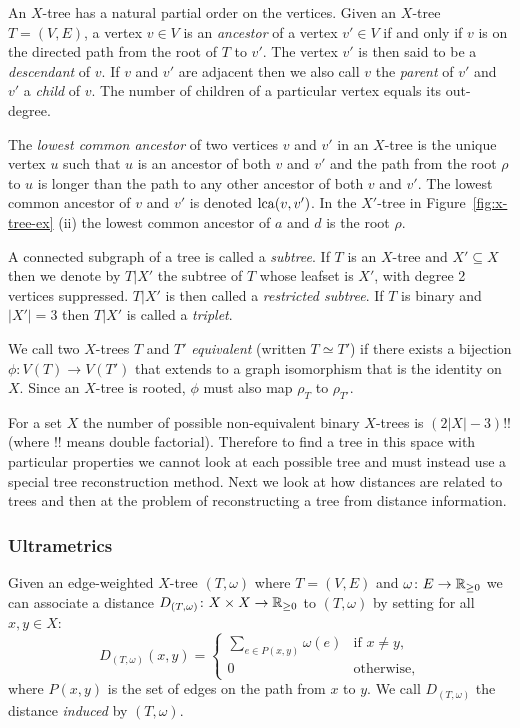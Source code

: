 An $X$-tree has a natural partial order on the vertices.  Given an $X$-tree
$T=(V,E)$, a vertex $v \in V$ is an \textit{ancestor} of a vertex $v' \in V$
if and only if $v$ is on the directed path from the root of $T$ to $v'$.  The
vertex $v'$ is then said to be a \textit{descendant} of $v$.  If $v$ and $v'$
are adjacent then we also call $v$ the \textit{parent} of $v'$ and $v'$ a
\textit{child} of $v$.  The number of children of a particular vertex equals
its out-degree.

The \textit{lowest common ancestor} of two vertices $v$ and $v'$ in an
$X$-tree is the unique vertex $u$ such that $u$ is an ancestor of both $v$ and
$v'$ and the path from the root $\rho$ to $u$ is longer than the path to any
other ancestor of both $v$ and $v'$.  The lowest common ancestor of $v$ and
$v'$ is denoted $\operatorname{lca}(v,v')$.  In the $X'$-tree in Figure~\ref{fig:x-tree-ex}
(ii) the lowest common ancestor of $a$ and $d$ is the root $\rho$.

A connected subgraph of a tree is called a \textit{subtree}.  If $T$ is an
$X$-tree and $X' \subseteq X$ then we denote by $T|X'$ the subtree of $T$
whose leafset is $X'$, with degree 2 vertices suppressed.  $T|X'$ is then
called a \textit{restricted subtree}.  If $T$ is binary and $|X'| = 3$ then
$T|X'$ is called a \textit{triplet}.

We call two $X$-trees $T$ and $T'$ \textit{equivalent} (written $T \simeq T'$)
if there exists a bijection $\phi \colon V(T) \to V(T')$ that extends to a
graph isomorphism that is the identity on $X$.  Since an $X$-tree is rooted,
$\phi$ must also map $\rho_{T}$ to $\rho_{T'}$.

For a set $X$ the number of possible non-equivalent binary $X$-trees is
$(2|X|-3)!!$ (where $!!$ means double factorial).  Therefore to find a tree in
this space with particular properties we cannot look at each possible tree and
must instead use a special tree reconstruction method.  Next we look at how
distances are related to trees and then at the problem of reconstructing a
tree from distance information.

\subsubsection{Ultrametrics}
\label{sec:ultrametrics}

Given an edge-weighted $X$-tree $(T,\omega)$ where $T=(V,E)$ and $\omega
\colon E \to {\mathbb R}_{\geq 0}$ we can associate a distance $D_{(T,\omega)} \colon X
\times X \to {\mathbb R}_{\geq 0}$ to $(T,\omega)$ by setting for all $x,y \in X$:
\begin{equation*}
  D_{(T,\omega)}(x,y) =
  \begin{cases}
    \displaystyle
    \sum_{e \in P(x,y)} \omega(e) & \text{if $x \neq y$},\\
    0 & \text{otherwise,}
  \end{cases}
\end{equation*}
where $P(x,y)$ is the set of edges on the path from $x$ to $y$.  We call
$D_{(T,\omega)}$ the distance \textit{induced} by $(T,\omega)$.  

